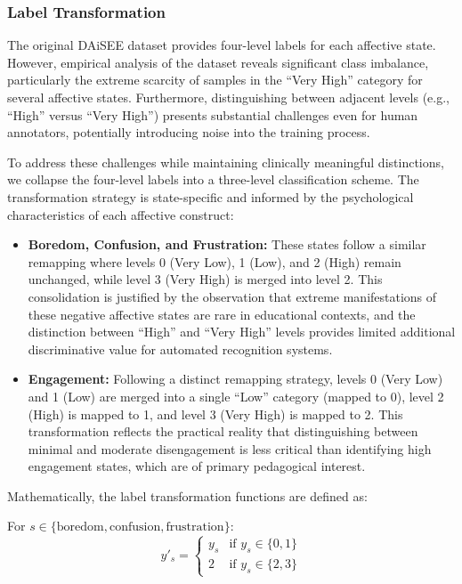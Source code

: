 \documentclass[11pt,a4paper]{article}
\begin{document}
\subsubsection{Label Transformation}

The original DAiSEE dataset provides four-level labels for each affective state. However, empirical analysis of the dataset reveals significant class imbalance, particularly the extreme scarcity of samples in the ``Very High'' category for several affective states. Furthermore, distinguishing between adjacent levels (e.g., ``High'' versus ``Very High'') presents substantial challenges even for human annotators, potentially introducing noise into the training process.

To address these challenges while maintaining clinically meaningful distinctions, we collapse the four-level labels into a three-level classification scheme. The transformation strategy is state-specific and informed by the psychological characteristics of each affective construct:

\begin{itemize}
  \item \textbf{Boredom, Confusion, and Frustration:} These states follow a similar remapping where levels 0 (Very Low), 1 (Low), and 2 (High) remain unchanged, while level 3 (Very High) is merged into level 2. This consolidation is justified by the observation that extreme manifestations of these negative affective states are rare in educational contexts, and the distinction between ``High'' and ``Very High'' levels provides limited additional discriminative value for automated recognition systems.

  \item \textbf{Engagement:} Following a distinct remapping strategy, levels 0 (Very Low) and 1 (Low) are merged into a single ``Low'' category (mapped to 0), level 2 (High) is mapped to 1, and level 3 (Very High) is mapped to 2. This transformation reflects the practical reality that distinguishing between minimal and moderate disengagement is less critical than identifying high engagement states, which are of primary pedagogical interest.
\end{itemize}

Mathematically, the label transformation functions are defined as:

For $s \in \{\text{boredom}, \text{confusion}, \text{frustration}\}$:
\begin{equation}
  y'_s =
  \begin{cases}
    y_s & \text{if } y_s \in \{0, 1\} \\
    2 & \text{if } y_s \in \{2, 3\}
  \end{cases}
\end{equation}
\end{document}
